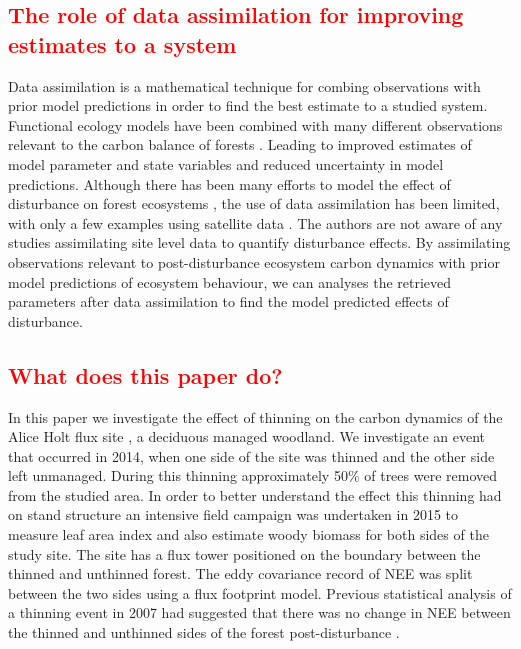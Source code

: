 \documentclass[11pt]{article}
\begin{document}
\subsection{\textcolor{red}{The role of data assimilation for improving estimates to a system}}
Data assimilation is a mathematical technique for combing observations with prior model predictions in order to find the best estimate to a studied system. Functional ecology models have been combined with many different observations relevant to the carbon balance of forests \citep{zobitz2011primer, fox2009reflex, richardson2010estimating, Quaife2008, Zobitz2014, Niu2014}. Leading to improved estimates of model parameter and state variables and reduced uncertainty in model predictions. Although there has been many efforts to model the effect of disturbance on forest ecosystems \citep{seidl2011modelling, thornton2002modeling}, the use of data assimilation has been limited, with only a few examples using satellite data \citep{kantzas2015improving, hilker2009new}. The authors are not aware of any studies assimilating site level data to quantify disturbance effects. By assimilating observations relevant to post-disturbance ecosystem carbon dynamics with prior model predictions of ecosystem behaviour, we can analyses the retrieved parameters after data assimilation to find the model predicted effects of disturbance.   

\subsection{\textcolor{red}{What does this paper do?}}
In this paper we investigate the effect of thinning on the carbon dynamics of the Alice Holt flux site \citep{wilkinson2012inter}, a deciduous managed woodland. We investigate an event that occurred in 2014, when one side of the site was thinned and the other side left unmanaged. During this thinning approximately 50\% of trees were removed from the studied area. In order to better understand the effect this thinning had on stand structure an intensive field campaign was undertaken in 2015 to measure leaf area index and also estimate woody biomass for both sides of the study site. The site has a flux tower positioned on the boundary between the thinned and unthinned forest. The eddy covariance record of NEE was split between the two sides using a flux footprint model. Previous statistical analysis of a thinning event in 2007 had suggested that there was no change in NEE between the thinned and unthinned sides of the forest post-disturbance \citep{wilkinson2015effects}.  
\end{document}
